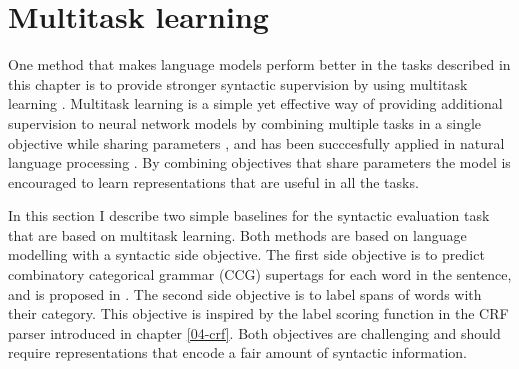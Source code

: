 \section{Multitask learning}
One method that makes language models perform better in the tasks described in this chapter is to provide stronger syntactic supervision by using multitask learning \citep{enguehard2017multitask,linzen2018targeted}. Multitask learning is a simple yet effective way of providing additional supervision to neural network models by combining multiple tasks in a single objective while sharing parameters \citep{caruana1997multitask}, and has been succcesfully applied in natural language processing \citep{collobert2008unified,collobert2011natural,zhang2016multitask,goldberg2016multitask}. By combining objectives that share parameters the model is encouraged to learn representations that are useful in all the tasks.

In this section I describe two simple baselines for the syntactic evaluation task that are based on multitask learning. Both methods are based on language modelling with a syntactic side objective. The first side objective is to predict combinatory categorical grammar (CCG) supertags \citep{bangalore1999supertagging} for each word in the sentence, and is proposed in \citep{enguehard2017multitask}. The second side objective is to label spans of words with their category. This objective is inspired by the label scoring function in the CRF parser introduced in chapter \ref{04-crf}. Both objectives are challenging and should require representations that encode a fair amount of syntactic information.


